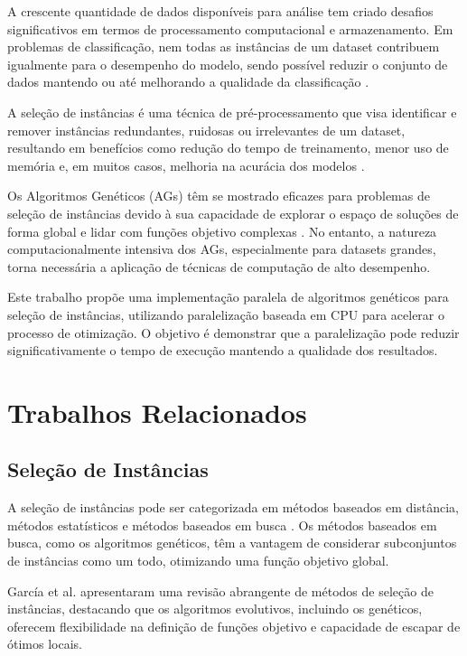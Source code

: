 \documentclass[12pt,a4paper]{article}
\begin{document}
A crescente quantidade de dados disponíveis para análise tem criado desafios significativos em termos de processamento computacional e armazenamento. Em problemas de classificação, nem todas as instâncias de um dataset contribuem igualmente para o desempenho do modelo, sendo possível reduzir o conjunto de dados mantendo ou até melhorando a qualidade da classificação \cite{garcia2012}.

A seleção de instâncias é uma técnica de pré-processamento que visa identificar e remover instâncias redundantes, ruidosas ou irrelevantes de um dataset, resultando em benefícios como redução do tempo de treinamento, menor uso de memória e, em muitos casos, melhoria na acurácia dos modelos \cite{liu2001}.

Os Algoritmos Genéticos (AGs) têm se mostrado eficazes para problemas de seleção de instâncias devido à sua capacidade de explorar o espaço de soluções de forma global e lidar com funções objetivo complexas \cite{cano2003}. No entanto, a natureza computacionalmente intensiva dos AGs, especialmente para datasets grandes, torna necessária a aplicação de técnicas de computação de alto desempenho.

Este trabalho propõe uma implementação paralela de algoritmos genéticos para seleção de instâncias, utilizando paralelização baseada em CPU para acelerar o processo de otimização. O objetivo é demonstrar que a paralelização pode reduzir significativamente o tempo de execução mantendo a qualidade dos resultados.

\section{Trabalhos Relacionados}

\subsection{Seleção de Instâncias}

A seleção de instâncias pode ser categorizada em métodos baseados em distância, métodos estatísticos e métodos baseados em busca \cite{wilson2000}. Os métodos baseados em busca, como os algoritmos genéticos, têm a vantagem de considerar subconjuntos de instâncias como um todo, otimizando uma função objetivo global.

García et al. \cite{garcia2012} apresentaram uma revisão abrangente de métodos de seleção de instâncias, destacando que os algoritmos evolutivos, incluindo os genéticos, oferecem flexibilidade na definição de funções objetivo e capacidade de escapar de ótimos locais.
\end{document}
